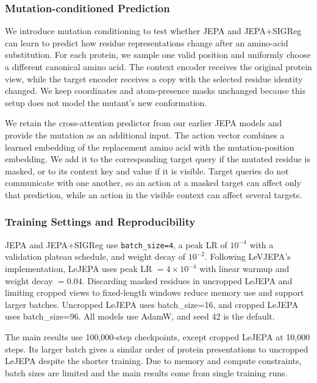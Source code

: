 \subsubsection{Mutation-conditioned Prediction}


We introduce mutation conditioning to test whether JEPA and JEPA+SIGReg can learn to predict how residue representations change after an amino-acid substitution. For each protein, we sample one valid position and uniformly choose a different canonical amino acid. The context encoder receives the original protein view, while the target encoder receives a copy with the selected residue identity changed. We keep coordinates and atom-presence masks unchanged because this setup does not model the mutant's new conformation.

We retain the cross-attention predictor from our earlier JEPA models and provide the mutation as an additional input. The action vector combines a learned embedding of the replacement amino acid with the mutation-position embedding. We add it to the corresponding target query if the mutated residue is masked, or to its context key and value if it is visible. Target queries do not communicate with one another, so an action at a masked target can affect only that prediction, while an action in the visible context can affect several targets. 

\subsubsection{Training Settings and Reproducibility}

JEPA and JEPA+SIGReg use \texttt{batch\_size=4}, a peak LR of $10^{-4}$ with a validation plateau schedule, and weight decay of $10^{-2}$.
Following LeVJEPA's implementation, LeJEPA uses peak LR $=4\times10^{-4}$ with linear warmup and weight decay $=0.04$. Discarding masked residues in uncropped LeJEPA and limiting cropped views to fixed-length windows reduce memory use and support larger batches. Uncropped LeJEPA uses batch\_size=16, and cropped LeJEPA uses batch\_size=96.
All models use AdamW, and seed 42 is the default. 

The main results use 100,000-step checkpoints, except cropped LeJEPA at 10,000 steps. Its larger batch gives a similar order of protein presentations to uncropped LeJEPA despite the shorter training.
Due to memory and compute constraints, batch sizes are limited and the main results come from single training runs.



